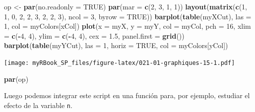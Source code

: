 \documentclass[
]{book}
\newenvironment{Shaded}{\begin{snugshade}}{\end{snugshade}}
\newcommand{\DataTypeTok}[1]{\textcolor[rgb]{0.13,0.29,0.53}{#1}}
\newcommand{\DecValTok}[1]{\textcolor[rgb]{0.00,0.00,0.81}{#1}}
\newcommand{\FloatTok}[1]{\textcolor[rgb]{0.00,0.00,0.81}{#1}}
\newcommand{\KeywordTok}[1]{\textcolor[rgb]{0.13,0.29,0.53}{\textbf{#1}}}
\newcommand{\NormalTok}[1]{#1}
\newcommand{\OperatorTok}[1]{\textcolor[rgb]{0.81,0.36,0.00}{\textbf{#1}}}
\newcommand{\OtherTok}[1]{\textcolor[rgb]{0.56,0.35,0.01}{#1}}
\newcommand{\StringTok}[1]{\textcolor[rgb]{0.31,0.60,0.02}{#1}}
\begin{document}
\begin{Shaded}
\begin{Highlighting}[]
\NormalTok{op <-}\StringTok{ }\KeywordTok{par}\NormalTok{(}\DataTypeTok{no.readonly =} \OtherTok{TRUE}\NormalTok{)}
\KeywordTok{par}\NormalTok{(}\DataTypeTok{mar =} \KeywordTok{c}\NormalTok{(}\DecValTok{2}\NormalTok{, }\DecValTok{3}\NormalTok{, }\DecValTok{1}\NormalTok{, }\DecValTok{1}\NormalTok{))}
\KeywordTok{layout}\NormalTok{(}\KeywordTok{matrix}\NormalTok{(}\KeywordTok{c}\NormalTok{(}\DecValTok{1}\NormalTok{, }\DecValTok{1}\NormalTok{, }\DecValTok{0}\NormalTok{, }
                \DecValTok{2}\NormalTok{, }\DecValTok{2}\NormalTok{, }\DecValTok{3}\NormalTok{, }
                \DecValTok{2}\NormalTok{, }\DecValTok{2}\NormalTok{, }\DecValTok{3}\NormalTok{), }\DataTypeTok{ncol =} \DecValTok{3}\NormalTok{, }\DataTypeTok{byrow =} \OtherTok{TRUE}\NormalTok{))}
\KeywordTok{barplot}\NormalTok{(}\KeywordTok{table}\NormalTok{(myXCut), }\DataTypeTok{las =} \DecValTok{1}\NormalTok{, }\DataTypeTok{col =}\NormalTok{ myColors[xCol])}
\KeywordTok{plot}\NormalTok{(}\DataTypeTok{x =}\NormalTok{ myX, }\DataTypeTok{y =}\NormalTok{ myY, }\DataTypeTok{col =}\NormalTok{ myCol, }\DataTypeTok{pch =} \DecValTok{16}\NormalTok{, }
  \DataTypeTok{xlim =} \KeywordTok{c}\NormalTok{(}\OperatorTok{-}\DecValTok{4}\NormalTok{, }\DecValTok{4}\NormalTok{), }\DataTypeTok{ylim =} \KeywordTok{c}\NormalTok{(}\OperatorTok{-}\DecValTok{4}\NormalTok{, }\DecValTok{4}\NormalTok{), }\DataTypeTok{cex =} \FloatTok{1.5}\NormalTok{, }
  \DataTypeTok{panel.first =} \KeywordTok{grid}\NormalTok{())}
\KeywordTok{barplot}\NormalTok{(}\KeywordTok{table}\NormalTok{(myYCut), }\DataTypeTok{las =} \DecValTok{1}\NormalTok{, }\DataTypeTok{horiz =} \OtherTok{TRUE}\NormalTok{, }\DataTypeTok{col =}\NormalTok{ myColors[yCol])}
\end{Highlighting}
\end{Shaded}

\texttt{[image: myRBook\_SP\_files/figure-latex/021-01-graphiques-15-1.pdf]}

\begin{Shaded}
\begin{Highlighting}[]
\KeywordTok{par}\NormalTok{(op)}
\end{Highlighting}
\end{Shaded}

Luego podemos integrar este script en una función para, por ejemplo, estudiar el efecto de la variable \texttt{n}.
\end{document}
